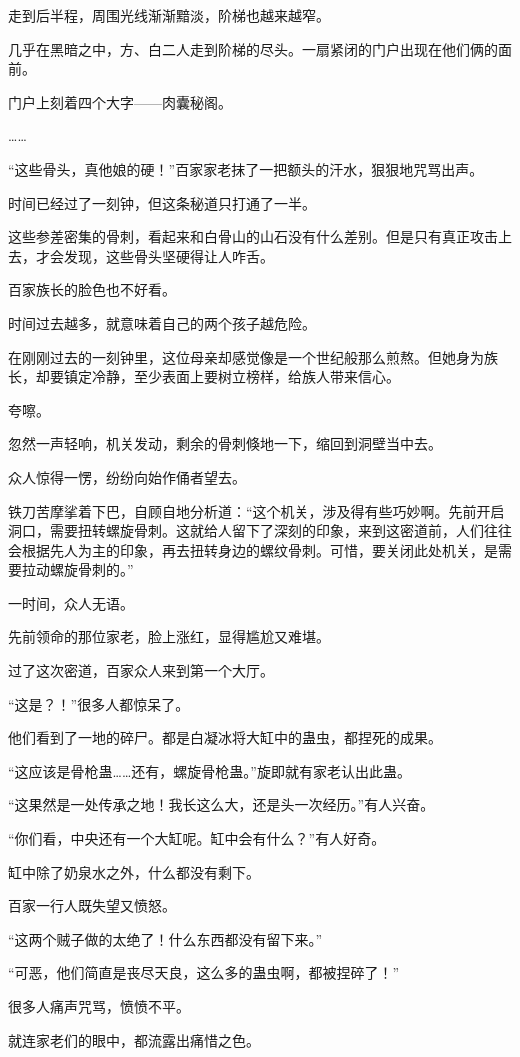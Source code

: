 \begin{this_body}
走到后半程，周围光线渐渐黯淡，阶梯也越来越窄。

几乎在黑暗之中，方、白二人走到阶梯的尽头。一扇紧闭的门户出现在他们俩的面前。

门户上刻着四个大字——肉囊秘阁。

……

“这些骨头，真他娘的硬！”百家家老抹了一把额头的汗水，狠狠地咒骂出声。

时间已经过了一刻钟，但这条秘道只打通了一半。

这些参差密集的骨刺，看起来和白骨山的山石没有什么差别。但是只有真正攻击上去，才会发现，这些骨头坚硬得让人咋舌。

百家族长的脸色也不好看。

时间过去越多，就意味着自己的两个孩子越危险。

在刚刚过去的一刻钟里，这位母亲却感觉像是一个世纪般那么煎熬。但她身为族长，却要镇定冷静，至少表面上要树立榜样，给族人带来信心。

夸嚓。

忽然一声轻响，机关发动，剩余的骨刺倏地一下，缩回到洞壁当中去。

众人惊得一愣，纷纷向始作俑者望去。

铁刀苦摩挲着下巴，自顾自地分析道：“这个机关，涉及得有些巧妙啊。先前开启洞口，需要扭转螺旋骨刺。这就给人留下了深刻的印象，来到这密道前，人们往往会根据先人为主的印象，再去扭转身边的螺纹骨刺。可惜，要关闭此处机关，是需要拉动螺旋骨刺的。”

一时间，众人无语。

先前领命的那位家老，脸上涨红，显得尴尬又难堪。

过了这次密道，百家众人来到第一个大厅。

“这是？！”很多人都惊呆了。

他们看到了一地的碎尸。都是白凝冰将大缸中的蛊虫，都捏死的成果。

“这应该是骨枪蛊……还有，螺旋骨枪蛊。”旋即就有家老认出此蛊。

“这果然是一处传承之地！我长这么大，还是头一次经历。”有人兴奋。

“你们看，中央还有一个大缸呢。缸中会有什么？”有人好奇。

缸中除了奶泉水之外，什么都没有剩下。

百家一行人既失望又愤怒。

“这两个贼子做的太绝了！什么东西都没有留下来。”

“可恶，他们简直是丧尽天良，这么多的蛊虫啊，都被捏碎了！”

很多人痛声咒骂，愤愤不平。

就连家老们的眼中，都流露出痛惜之色。


\end{this_body}
